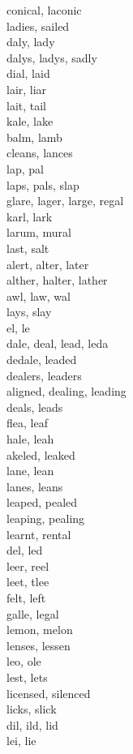 conical, laconic\\
ladies, sailed\\
daly, lady\\
dalys, ladys, sadly\\
dial, laid\\
lair, liar\\
lait, tail\\
kale, lake\\
balm, lamb\\
cleans, lances\\
lap, pal\\
laps, pals, slap\\
glare, lager, large, regal\\
karl, lark\\
larum, mural\\
last, salt\\
alert, alter, later\\
alther, halter, lather\\
awl, law, wal\\
lays, slay\\
el, le\\
dale, deal, lead, leda\\
dedale, leaded\\
dealers, leaders\\
aligned, dealing, leading\\
deals, leads\\
flea, leaf\\
hale, leah\\
akeled, leaked\\
lane, lean\\
lanes, leans\\
leaped, pealed\\
leaping, pealing\\
learnt, rental\\
del, led\\
leer, reel\\
leet, tlee\\
felt, left\\
galle, legal\\
lemon, melon\\
lenses, lessen\\
leo, ole\\
lest, lets\\
licensed, silenced\\
licks, slick\\
dil, ild, lid\\
lei, lie\\
